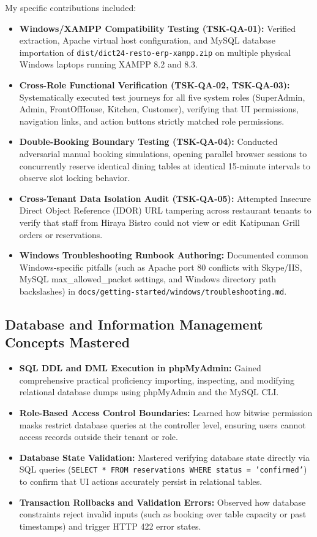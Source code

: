 My specific contributions included:
\begin{itemize}
    \item \textbf{Windows/XAMPP Compatibility Testing (TSK-QA-01):} Verified extraction, Apache virtual host configuration, and MySQL database importation of \texttt{dist/dict24-resto-erp-xampp.zip} on multiple physical Windows laptops running XAMPP 8.2 and 8.3.
    \item \textbf{Cross-Role Functional Verification (TSK-QA-02, TSK-QA-03):} Systematically executed test journeys for all five system roles (SuperAdmin, Admin, FrontOfHouse, Kitchen, Customer), verifying that UI permissions, navigation links, and action buttons strictly matched role permissions.
    \item \textbf{Double-Booking Boundary Testing (TSK-QA-04):} Conducted adversarial manual booking simulations, opening parallel browser sessions to concurrently reserve identical dining tables at identical 15-minute intervals to observe slot locking behavior.
    \item \textbf{Cross-Tenant Data Isolation Audit (TSK-QA-05):} Attempted Insecure Direct Object Reference (IDOR) URL tampering across restaurant tenants to verify that staff from Hiraya Bistro could not view or edit Katipunan Grill orders or reservations.
    \item \textbf{Windows Troubleshooting Runbook Authoring:} Documented common Windows-specific pitfalls (such as Apache port 80 conflicts with Skype/IIS, MySQL max\_allowed\_packet settings, and Windows directory path backslashes) in \texttt{docs/getting-started/windows/troubleshooting.md}.
\end{itemize}

\subsection{Database and Information Management Concepts Mastered}
\begin{itemize}
    \item \textbf{SQL DDL and DML Execution in phpMyAdmin:} Gained comprehensive practical proficiency importing, inspecting, and modifying relational database dumps using phpMyAdmin and the MySQL CLI.
    \item \textbf{Role-Based Access Control Boundaries:} Learned how bitwise permission masks restrict database queries at the controller level, ensuring users cannot access records outside their tenant or role.
    \item \textbf{Database State Validation:} Mastered verifying database state directly via SQL queries (\texttt{SELECT * FROM reservations WHERE status = 'confirmed'}) to confirm that UI actions accurately persist in relational tables.
    \item \textbf{Transaction Rollbacks and Validation Errors:} Observed how database constraints reject invalid inputs (such as booking over table capacity or past timestamps) and trigger HTTP 422 error states.
\end{itemize}

